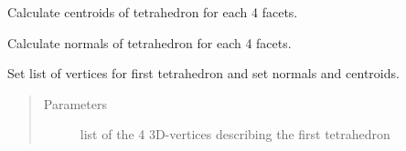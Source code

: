 \documentclass[letterpaper,10pt,english]{sphinxmanual}
\begin{document}
\begin{fulllineitems}
\begin{fulllineitems}
\begin{quote}
\begin{description}
\end{description}\end{quote}

\end{fulllineitems}


\begin{fulllineitems}
\label{\detokenize{pk_src.intersection_tet_tet:pk_src.intersection_tet_tet.intersection_tet_tet.setCentroid}}
Calculate centroids of tetrahedron for each 4 facets.

\end{fulllineitems}


\begin{fulllineitems}
\label{\detokenize{pk_src.intersection_tet_tet:pk_src.intersection_tet_tet.intersection_tet_tet.setNormals}}
Calculate normals of tetrahedron for each 4 facets.

\end{fulllineitems}


\begin{fulllineitems}
\label{\detokenize{pk_src.intersection_tet_tet:pk_src.intersection_tet_tet.intersection_tet_tet.setV1}}
Set list of vertices for first tetrahedron and set normals and centroids.
\begin{quote}\begin{description}
\item[{Parameters}] \leavevmode
{} \textendash{} list of the 4 3D-vertices describing the first tetrahedron

\end{description}\end{quote}

\end{fulllineitems}



\end{fulllineitems}
\end{document}
